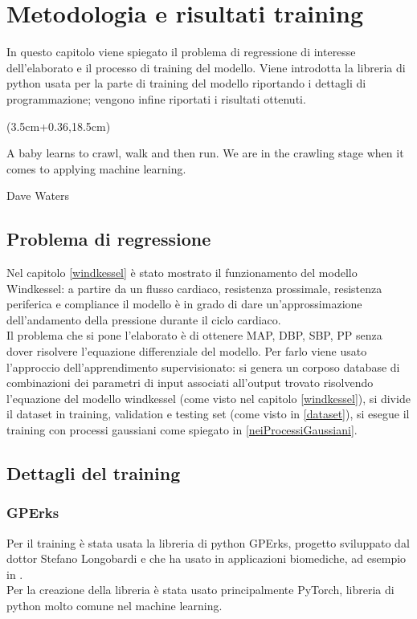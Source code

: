 \chapter{Metodologia e risultati training}\label{Capitolo: risultati training}


In questo capitolo viene spiegato il problema di regressione di interesse dell'elaborato e il processo di training del modello. Viene introdotta la libreria di python usata per la parte di training del modello riportando i dettagli di programmazione; vengono infine riportati i risultati ottenuti.


\begin{textblock*}{0.64\textwidth}(3.5cm+0.36\textwidth,18.5cm)
\epigraph{A baby learns to crawl, walk and then run. We are in the crawling stage when it comes to applying machine learning.}{Dave Waters}
\end{textblock*}

\newpage

\section{Problema di regressione}
Nel capitolo \ref{windkessel} è stato mostrato il funzionamento del modello Windkessel: a partire da un flusso cardiaco, resistenza prossimale, resistenza periferica e compliance il modello è in grado di dare un'approssimazione dell'andamento della pressione durante il ciclo cardiaco.\\
Il problema che si pone l'elaborato è di ottenere MAP, DBP, SBP, PP senza dover risolvere l'equazione differenziale del modello. Per farlo viene usato l'approccio dell'apprendimento supervisionato: si genera un corposo database di combinazioni dei parametri di input associati all'output trovato risolvendo l'equazione del modello windkessel (come visto nel capitolo \ref{windkessel}), si divide il dataset in training, validation e testing set (come visto in \ref{dataset}), si esegue il training con processi gaussiani come spiegato in \ref{neiProcessiGaussiani}.


\section{Dettagli del training}

\subsection{GPErks}
Per il training è stata usata la libreria di python GPErks, progetto sviluppato dal dottor Stefano Longobardi e che ha usato in applicazioni biomediche, ad esempio in \cite{doi:10.1098/rsta.2019.0334}.\\
Per la creazione della libreria è stata usato principalmente PyTorch, libreria di python molto comune nel machine learning.\\

